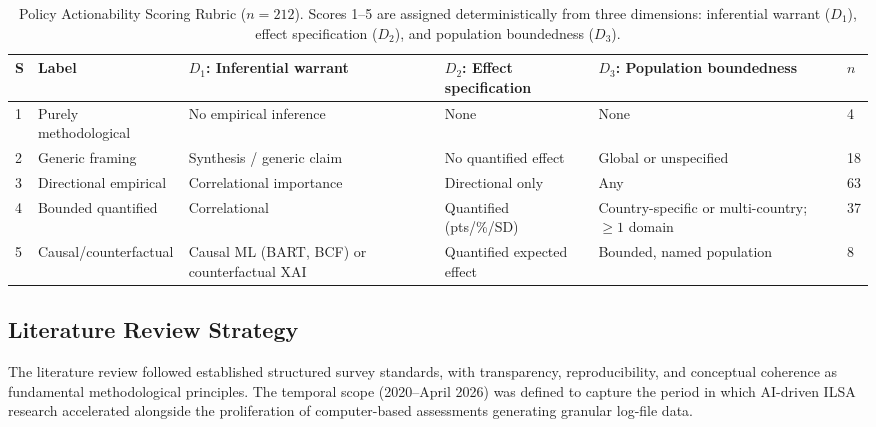\documentclass{ieeeaccess}
\begin{document}
\begin{table}[!t]
\centering\footnotesize\renewcommand{\arraystretch}{1.25}
\caption{Policy Actionability Scoring Rubric ($n = 212$). Scores 1--5 are assigned deterministically from three dimensions: inferential warrant ($D_1$), effect specification ($D_2$), and population boundedness ($D_3$).}
\label{tab:actionability-rubric}
\begin{tabularx}{\textwidth}{p{0.3cm}p{3cm}p{3.5cm}p{3.5cm}p{4.5cm}p{0.1cm}}
\toprule
S & Label & $D_1$: Inferential warrant & $D_2$: Effect specification & $D_3$: Population boundedness & $n$ \\
\midrule
1 & Purely methodological  & No empirical inference        & None                      & None                                              & 4  \\
2 & Generic framing        & Synthesis / generic claim     & No quantified effect      & Global or unspecified                             & 18 \\
3 & Directional empirical  & Correlational importance      & Directional only          & Any                                               & 63 \\
4 & Bounded quantified     & Correlational                 & Quantified (pts/\%/SD)    & Country-specific or multi-country; $\geq1$ domain & 37 \\
5 & Causal/counterfactual  & Causal ML (BART, BCF) or counterfactual XAI & Quantified expected effect & Bounded, named population          & 8  \\
\bottomrule
\end{tabularx}
\end{table}

\subsection{Literature Review Strategy}\label{subsec:literature-review}

The literature review followed established structured survey standards, with transparency, reproducibility, and conceptual coherence as fundamental methodological principles. The temporal scope (2020--April 2026) was defined to capture the period in which AI-driven ILSA research accelerated alongside the proliferation of computer-based assessments generating granular log-file data.
\end{document}
